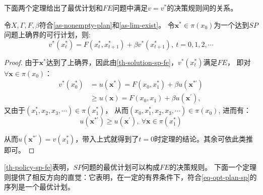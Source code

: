 下面两个定理给出了最优计划和$FE$问题中满足$v=v^*$的决策规则间的关系。

\begin{theorem} \label{th-policy-sp-fe}
    令$X, \Gamma, F, \beta$符合\cref{as-nonempty-plan}和\cref{as-lim-exist}。
    令$\boldsymbol{x}^*\in \pi\left(x_0\right)$为一个达到$SP$问题上确界的可行计划，则:
    \begin{equation} \label{eq-opt-plan-sp}
        v^*\left(x_t^*\right) = F\left(x_t^*,x_{t+1}^*\right) + \beta v^*\left(x_{t+1}^*\right), ~t=0,1,2,\cdots
    \end{equation}
\end{theorem}

\begin{proof}
    由于$\boldsymbol{x}^*$达到了上确界，因此由\cref{th-solution-sp-fe}，$v^*\left(x_t^*\right)$满足$FE$，
    即对$\forall \boldsymbol{x}\in \pi\left(x_0\right)$：
    \begin{equation*}
        \begin{aligned}
            v^*\left(x_0^*\right) &= u\left(\boldsymbol{x}^*\right) = F\left(x_0,x_1^*\right) 
                + \beta u\left(\boldsymbol{x^{*\prime}}\right) \\
            &\geq u\left(\boldsymbol{x}\right) = F\left(x_0,x_1\right)+\beta u\left(\boldsymbol{x}^{\prime}\right), 
        \end{aligned}
    \end{equation*}
    又由于$\left(x_1^*,x_2,x_3,\cdots\right)\in \pi\left(x_1^*\right)$，
    从而$\left(x_0,x_1^*,x_2,x_3,\cdots\right)\in \pi\left(x_0\right)$,
    进而有：
    \begin{equation*}
        u\left(\boldsymbol{x}^{*\prime}\right) \geq u\left(\boldsymbol{x}^{\prime}\right), 
            ~ \forall \boldsymbol{x}\in \pi\left(x_1^*\right)
    \end{equation*}
    
    从而$u\left(\boldsymbol{x}^{*\prime}\right)=v\left(x_1^*\right)$，带入上式就得到了$t=0$时定理的结论。其余可依此类推即可。
\end{proof}

\cref{th-policy-sp-fe}表明，$SP$问题的最优计划可以构成$FE$的决策规则。
下面一个定理则提供了相反方向的直觉：它表明，在一定的有界条件下，符合\cref{eq-opt-plan-sp}的序列是一个最优计划。

